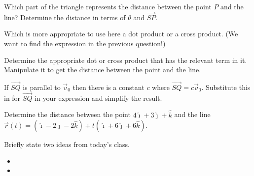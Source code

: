 \begin{problem}
\begin{subproblem}
    \item Which part of the triangle represents the distance between the point $P$ and the line? Determine the distance in terms of $\theta$ and $\overrightarrow{SP}$.
      \vfill

    \item Which is more appropriate to use here a dot product or a cross product. (We want to find the expression in the previous question!)
      \vspace{3em}

    \item Determine the appropriate dot or cross product that has the relevant term in it. Manipulate it to get the distance between the point and the line.
      \vfill

    \item If $\overrightarrow{SQ}$ is parallel to $\vec{v}_0$ then there is a constant $c$ where $\overrightarrow{SQ}=c\vec{v}_0$.
      Substitute this in for $\overrightarrow{SQ}$ in your expression and simplify the result.

      \vfill

  \end{subproblem}

  \clearpage

  \item Determine the distance between the point $4\hat{\imath} + 3 \hat{\jmath} + \hat{k}$ and the line $\vec{r}(t)=\left(\hat{\imath}-2\hat{\jmath}-2\hat{k}\right)+t\left(\hat{\imath}+6\hat{\jmath}+6\hat{k}\right)$.
    \vfill

\end{problem}


\postClass

\begin{problem}
\item Briefly state two ideas from today's class.
  \begin{itemize}
  \item
  \item
  \end{itemize}
\item
  \begin{subproblem}
    \item
  \end{subproblem}
\end{problem}



